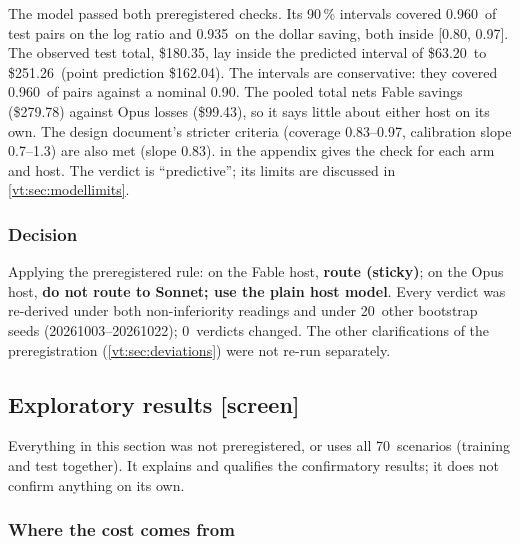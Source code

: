 \documentclass[11pt,letterpaper]{article}
\newcommand{\screen}{\mbox{\textsf{\small\color{okgray}[screen]}}}
\newcommand{\CovHigh}{0.97}
\newcommand{\CovLow}{0.80}
\newcommand{\DecisionFable}{route (sticky)}
\newcommand{\DecisionOpus}{do not route to Sonnet; use the plain host model}
\newcommand{\DesignCovHigh}{0.97}
\newcommand{\DesignCovLow}{0.83}
\newcommand{\DesignSlopeHigh}{1.3}
\newcommand{\DesignSlopeLow}{0.7}
\newcommand{\MCCovLog}{0.960}
\newcommand{\MCCovUSD}{0.935}
\newcommand{\MCFableTotal}{279.78}
\newcommand{\MCNominal}{0.90}
\newcommand{\MCObserved}{180.35}
\newcommand{\MCOpusTotal}{99.43}
\newcommand{\MCPIHigh}{251.26}
\newcommand{\MCPILow}{63.20}
\newcommand{\MCPredicted}{162.04}
\newcommand{\MCSlope}{0.83}
\newcommand{\MCVerdict}{predictive}
\newcommand{\NScenarios}{70}
\newcommand{\NSeeds}{20}
\newcommand{\SeedHi}{20261022}
\newcommand{\SeedLo}{20261003}
\newcommand{\SeedsChanged}{0}
\begin{document}
The model passed both preregistered checks. Its 90\,\% intervals covered \MCCovLog\ of test pairs on the log
ratio and \MCCovUSD\ on the dollar saving, both inside [\CovLow, \CovHigh]. The observed test total,
\$\MCObserved, lay inside the predicted interval of \$\MCPILow\ to \$\MCPIHigh\ (point prediction
\$\MCPredicted). The intervals are conservative: they covered \MCCovLog\ of pairs against a nominal
\MCNominal. The pooled total nets Fable savings (\$\MCFableTotal) against Opus losses (\$\MCOpusTotal), so
it says little about either host on its own. The design document's stricter criteria (coverage
\DesignCovLow--\DesignCovHigh, calibration slope \DesignSlopeLow--\DesignSlopeHigh) are also met (slope
\MCSlope).  in the appendix gives the check for each arm and host. The verdict is
``\MCVerdict''; its limits are discussed in \cref{vt:sec:modellimits}.

\subsubsection{Decision}

Applying the preregistered rule: on the Fable host, \textbf{\DecisionFable}; on the Opus host,
\textbf{\DecisionOpus}. Every verdict was re-derived under both non-inferiority readings and under
\NSeeds\ other bootstrap seeds (\SeedLo--\SeedHi); \SeedsChanged\ verdicts changed. The other
clarifications of the preregistration (\cref{vt:sec:deviations}) were not re-run separately.
\subsection{Exploratory results \texorpdfstring{\screen}{[screen]}}\label{vt:sec:explore}

Everything in this section was not preregistered, or uses all \NScenarios\ scenarios (training and test
together). It explains and qualifies the confirmatory results; it does not confirm anything on its own.

\subsubsection{Where the cost comes from}\label{vt:sec:composition}
\end{document}
